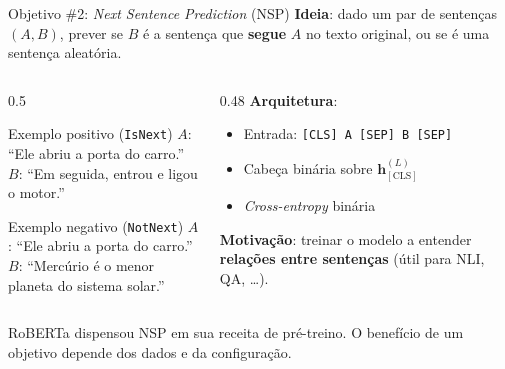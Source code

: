 \documentclass[aspectratio=169, xcolor=dvipsnames]{beamer}
\begin{document}
  \begin{frame}{Objetivo \#2: \textit{Next Sentence Prediction} (NSP)}
    \textbf{Ideia}: dado um par de sentenças $(A, B)$, prever se $B$ é a sentença que \textbf{segue} $A$ no texto original, ou se é uma sentença aleatória.
    \vspace{0.4em}
    \begin{columns}
      \begin{column}{0.5\textwidth}
        \begin{exampleblock}{Exemplo positivo (\texttt{IsNext})}
          $A$: ``Ele abriu a porta do carro.'' \\
          $B$: ``Em seguida, entrou e ligou o motor.''
        \end{exampleblock}
        \begin{exampleblock}{Exemplo negativo (\texttt{NotNext})}
          $A$: ``Ele abriu a porta do carro.'' \\
          $B$: ``Mercúrio é o menor planeta do sistema solar.''
        \end{exampleblock}
      \end{column}
      \begin{column}{0.48\textwidth}
        \textbf{Arquitetura}:
        \begin{itemize}
          \item Entrada: \texttt{[CLS] A [SEP] B [SEP]}
          \item Cabeça binária sobre $\mathbf{h}_{[\text{CLS}]}^{(L)}$
          \item \textit{Cross-entropy} binária
        \end{itemize}
        \vspace{0.3em}
        \textbf{Motivação}: treinar o modelo a entender \textbf{relações entre sentenças} (útil para NLI, QA, \ldots).
      \end{column}
    \end{columns}
    \vspace{0.3em}
    RoBERTa  dispensou NSP em sua receita
    de pré-treino. O benefício de um objetivo depende dos dados e da configuração.
  \end{frame}
\end{document}
